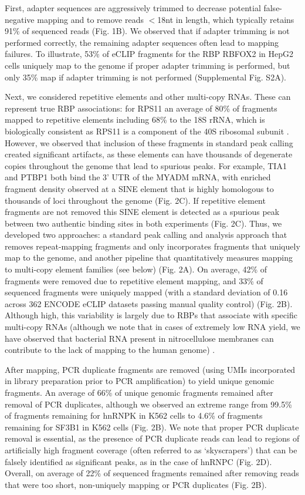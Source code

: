 First, adapter sequences are aggressively trimmed to decrease potential false-negative mapping and to remove reads $<$18nt in length, which typically retains 91\% of sequenced reads (Fig. 1B). We observed that if adapter trimming is not performed correctly, the remaining adapter sequences often lead to mapping failures. To illustrate, 53\% of eCLIP fragments for the RBP RBFOX2 in HepG2 cells uniquely map to the genome if proper adapter trimming is performed, but only 35\% map if adapter trimming is not performed (Supplemental Fig. S2A).

Next, we considered repetitive elements and other multi-copy RNAs. These can represent true RBP associations: for RPS11 an average of 80\% of fragments mapped to repetitive elements including 68\% to the 18S rRNA, which is biologically consistent as RPS11 is a component of the 40S ribosomal subunit \cite{Taylor2009}. However, we observed that inclusion of these fragments in standard peak calling created significant artifacts, as these elements can have thousands of degenerate copies throughout the genome that lead to spurious peaks. For example, TIA1 and PTBP1 both bind the 3’ UTR of the MYADM mRNA, with enriched fragment density observed at a SINE element that is highly homologous to thousands of loci throughout the genome (Fig. 2C). If repetitive element fragments are not removed this SINE element is detected as a spurious peak between two authentic binding sites in both experiments (Fig. 2C). Thus, we developed two approaches: a standard peak calling and analysis approach that removes repeat-mapping fragments and only incorporates fragments that uniquely map to the genome, and another pipeline that quantitatively measures mapping to multi-copy element families (see below) (Fig. 2A). On average, 42\% of fragments were removed due to repetitive element mapping, and 33\% of sequenced fragments were uniquely mapped (with a standard deviation of 0.16 across 362 ENCODE eCLIP datasets passing manual quality control) (Fig. 2B). Although high, this variability is largely due to RBPs that associate with specific multi-copy RNAs (although we note that in cases of extremely low RNA yield, we have observed that bacterial RNA present in nitrocellulose membranes can contribute to the lack of mapping to the human genome) \cite{VanNostrand2017b}.

After mapping, PCR duplicate fragments are removed (using UMIs incorporated in library preparation prior to PCR amplification) to yield unique genomic fragments. An average of 66\% of unique genomic fragments remained after removal of PCR duplicates, although we observed an extreme range from 99.5\% of fragments remaining for hnRNPK in K562 cells to 4.6\% of fragments remaining for SF3B1 in K562 cells (Fig. 2B). We note that proper PCR duplicate removal is essential, as the presence of PCR duplicate reads can lead to regions of artificially high fragment coverage (often referred to as ‘skyscrapers’) that can be falsely identified as significant peaks, as in the case of hnRNPC (Fig. 2D). Overall, on average of 22\% of sequenced fragments remained after removing reads that were too short, non-uniquely mapping or PCR duplicates (Fig. 2B).

